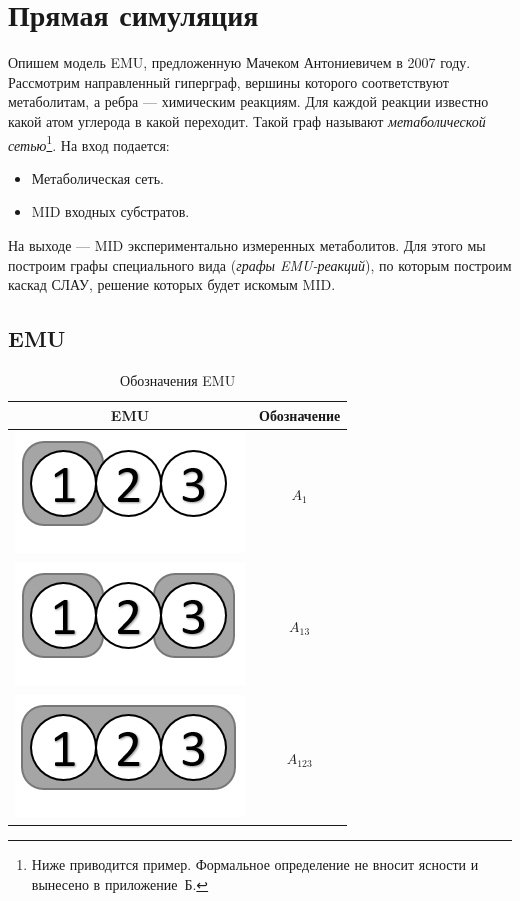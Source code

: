 \documentclass[14pt, a4paper]{extreport}
\begin{document}
\section{Прямая симуляция}
Опишем модель EMU, предложенную Мачеком Антониевичем в 2007 году\cite{EMU_2007}. Рассмотрим направленный гиперграф, вершины которого соответствуют метаболитам, а ребра --- химическим реакциям. Для каждой реакции известно какой атом углерода в какой переходит. Такой граф называют \emph{метаболической сетью}\footnote{Ниже приводится пример. Формальное определение не вносит ясности и вынесено в приложение~Б.}. На вход подается:
\begin{itemize}
	\item Метаболическая сеть.
	\item MID входных субстратов.
\end{itemize}
На выходе --- MID экспериментально измеренных метаболитов.
Для этого мы построим графы специального вида (\emph{графы EMU-реакций}), по которым построим каскад СЛАУ, решение которых будет искомым MID.
\subsection{EMU}

\begin{table}
	\begin{tabular}{c | c}
		EMU & Обозначение\\
		\hline
		\includegraphics[scale=0.6]{emus/EMUA1.png} & $A_1$\\
		\hline
		\includegraphics[scale=0.6]{emus/EMU13.png} & $A_{13}$\\
		\hline
		\includegraphics[scale=0.6]{emus/EMU123.png} & $A_{123}$\\
	\end{tabular}
	\caption{Обозначения EMU}
	\label{EMU}
\end{table}
\end{document}
